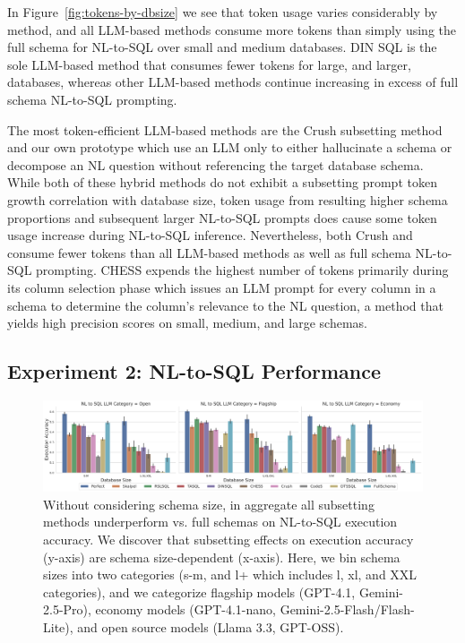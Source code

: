 In Figure~\ref{fig:tokens-by-dbsize} we see that token usage varies considerably by method, and all LLM-based methods consume more tokens than simply using the full schema for NL-to-SQL over small and medium databases.
DIN SQL is the sole LLM-based method that consumes fewer tokens for large, and larger, databases, whereas other LLM-based methods continue increasing in excess of full schema NL-to-SQL prompting.

The most token-efficient LLM-based methods are the Crush subsetting method and our own \PROJECTNAME{ }prototype which use an LLM only to either hallucinate a schema or decompose an NL question without referencing the target database schema. 
While both of these hybrid methods do not exhibit a subsetting prompt token growth correlation with database size, token usage from resulting higher schema proportions and subsequent larger NL-to-SQL prompts does cause some token usage increase during NL-to-SQL inference.
Nevertheless, both Crush and \PROJECTNAME{ }consume fewer tokens than all LLM-based methods as well as full schema NL-to-SQL prompting.
CHESS expends the highest number of tokens primarily during its column selection phase which issues an LLM prompt for every column in a schema to determine the column's relevance to the NL question, a method that yields high precision scores on small, medium, and large schemas.

\subsection{Experiment 2: NL-to-SQL Performance}

\begin{figure}
  \centering
  \includegraphics[width=\linewidth]{figures/nlsql_execution_accuracy_barchart_compact.pdf}
  \caption{Without considering schema size, in aggregate all subsetting methods underperform vs. full schemas on NL-to-SQL execution accuracy. We discover that subsetting effects on execution accuracy (y-axis) are schema size-dependent (x-axis). Here, we bin schema sizes into two categories (s-m, and l+ which includes l, xl, and XXL categories), and we categorize flagship models (GPT-4.1, Gemini-2.5-Pro), economy models (GPT-4.1-nano, Gemini-2.5-Flash/Flash-Lite), and open source models (Llama 3.3, GPT-OSS).}
  \label{fig:nlsqlbarchart}
\end{figure}




